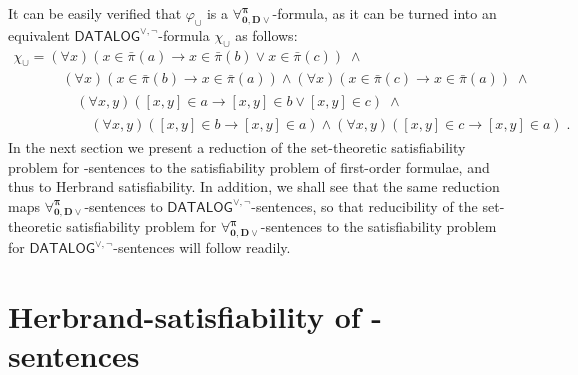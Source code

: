 \documentclass[manyauthors]{fundam}
\newcommand{\DisjDatalog}{\ensuremath{\mathsf{DATALOG}^{\vee,\neg}}\xspace}
\newcommand{\ForallpizeroDisjDatalog}{\ensuremath{\mathbf{\forall_{0,D\vee}^{\pi}}}\xspace}
\newcommand{\pairin}[3]{\left[#1,#2\right] \in #3}
\newcommand{\nonpairin}[2]{#1 \in \bar{\pi}(#2)}
\newcommand{\red}[1]{\textcolor{red}{#1}}
\begin{document}
It can be easily verified that $\varphi_{\cup}$ is a
$\ForallpizeroDisjDatalog$-formula, as it can be turned into an equivalent
\DisjDatalog-formula $\chi_{\cup}$ as follows:
\[
\begin{array}{l}
\chi_{\cup} = \left(\forall x\right)\left(\nonpairin{x}{a} \rightarrow \nonpairin{x}{b}
\vee \nonpairin{x}{c}\right) \; \wedge \\
\phantom{\chi_{\cup} = }\quad  \left(\forall x\right)\left(\nonpairin{x}{b}
\rightarrow \nonpairin{x}{a}\right) \wedge \left(\forall x\right)
\left(\nonpairin{x}{c} \rightarrow \nonpairin{x}{a}\right) \; \wedge\\
\phantom{\chi_{\cup} = }\quad\quad\left(\forall x,y\right)\left(\pairin{x}{y}{a} \rightarrow
\pairin{x}{y}{b} \vee \pairin{x}{y}{c}\right) \; \wedge \\
\phantom{\chi_{\cup} = }\quad\quad\quad  \left(\forall
x,y\right)\left(\pairin{x}{y}{b} \rightarrow \pairin{x}{y}{a}\right)
\wedge \left(\forall
x,y\right)\left(\pairin{x}{y}{c} \rightarrow \pairin{x}{y}{a}\right) \;
.
\end{array}
\]
%
%
In the next section we present a reduction of the set-theoretic
satisfiability problem for \Forallpizero-sentences to the satisfiability
problem of first-order formulae, and thus to Herbrand
satisfiability. In addition, we shall see that the same reduction 
maps $\ForallpizeroDisjDatalog$-sentences
to $\DisjDatalog$-sentences, so that reducibility of the set-theoretic
satisfiability problem for $\ForallpizeroDisjDatalog$-sentences to the
satisfiability problem for $\DisjDatalog$-sentences will follow readily.


\section{Herbrand-satisfiability of \Forallpizero-sentences}\label{REDUCTION}

\newcommand{\regf}{\chi_1}
\newcommand{\exonef}{\chi_2}
\newcommand{\extwof}{\chi_3^{(V,T)}}
\newcommand{\eqf}{\chi_4^{(V,T)}}

\newcommand{\distPbyS}{\mathit{distBy}_{\pi}}
\newcommand{\distbyS}{\mathit{distBy}}
\newcommand{\distPS}{\mathsf{dist}_{\pi}}
\newcommand{\distS}{\mathsf{dist}}
\newcommand{\CPpizeroS}{P^{\bar{\pi}}}
\newcommand{\PpizeroS}{P^{[,]}}
\newcommand{\EqPpizeroS}{P^{=}}
\end{document}
